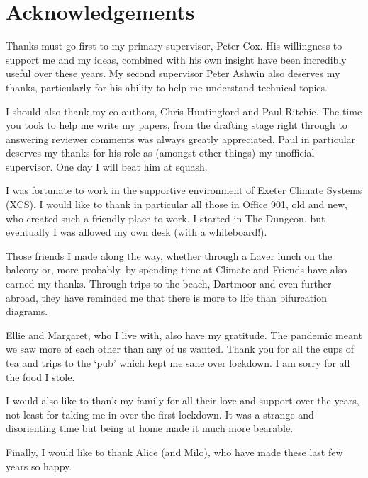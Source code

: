 \chapter{Acknowledgements}

Thanks must go first to my primary supervisor, Peter Cox. His willingness to support me and my ideas, combined with his own insight
have been incredibly useful over these years. My second supervisor Peter Ashwin also deserves my thanks,
particularly for his ability to help me understand technical topics.

I should also thank my co-authors, Chris Huntingford and Paul Ritchie. The time you took to help me
write my papers, from the drafting stage right through to answering reviewer comments was always greatly appreciated. Paul
in particular deserves my thanks for his role as (amongst other things) my unofficial supervisor. One day I will beat him at squash.

I was fortunate to work in the supportive environment of Exeter Climate Systems (XCS). I would like to thank in particular
all those in Office 901, old and new, who created such a friendly place to work. I started in The Dungeon,
but eventually I was allowed my own desk (with a whiteboard!).

Those friends I made along the way, whether through a Laver lunch on the balcony or, more probably, by spending time at Climate and
Friends have also earned my thanks. Through trips to the beach, Dartmoor and even further abroad, they have reminded me that there is more to life
than bifurcation diagrams.

Ellie and Margaret, who I live with, also have my gratitude. The pandemic meant we saw more of each other than any of us wanted.
Thank you for all the cups of tea and trips to the `pub' which kept me sane over lockdown. I am sorry for
all the food I stole.

I would also like to thank my family for all their love and support over the years, not least for taking me in over the first lockdown.
It was a strange and disorienting time but being at home made it much more bearable.

Finally, I would like to thank Alice (and Milo), who have made these last few years so happy.